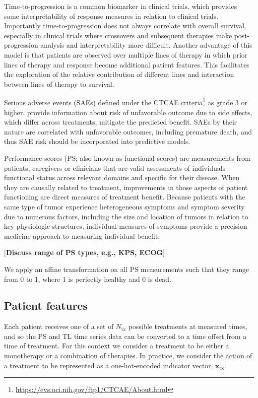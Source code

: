\documentclass[twocolumn]{bmcart}%
\newcommand{\todo}[1]{{\color{red} [\bf{#1}]}}
\def\v#1{\bm{#1}}
\begin{document}
Time-to-progression is a common biomarker in clinical trials, which provides
some interpretability of response measures in relation to clinical trials.
Importantly time-to-progression does not always correlate with overall
survival, especially in clinical trials where crossovers and subsequent
therapies make post-progression analysis and interpretability more difficult.
Another advantage of this model is that patients are observed over multiple
lines of therapy in which prior lines of therapy and response become additional
patient features.  This facilitates the exploration of the relative
contribution of different lines and interaction between lines of therapy to
survival.

Serious adverse events (SAEs) defined under the \mbox{CTCAE}
criteria\footnote{\url{https://evs.nci.nih.gov/ftp1/CTCAE/About.html}} as grade
3 or higher, provide information about risk of unfavorable outcome due to side
effects, which differ across treatments, mitigate the predicted benefit.  SAEs
by their nature are correlated with unfavorable outcomes, including premature
death, and thus SAE risk should be incorporated into predictive models.

Performance scores (PS; also known as functional scores) are measurements from
patients, caregivers or clinicians that are valid assessments of individuals
functional status across relevant domains and specific for their disease.  When
they are causally related to treatment, improvements in those aspects of
patient functioning are direct measures of treatment benefit.  Because patients
with the same type of tumor experience heterogeneous symptoms and symptom
severity due to numerous factors, including the size and location of tumors in
relation to key physiologic structures, individual measures of symptoms provide
a precision medicine approach to measuring individual benefit.

\todo{Discuss range of PS types, e.g., KPS, ECOG}

We apply an affine transformation on all PS measurements such that they range
from 0 to 1, where 1 is perfectly healthy and 0 is dead.


\subsection{Patient features}\label{sec:data-features}

Each patient receives one of a set of $N_\text{tx}$
possible treatments at measured times, and so the PS and TL time series data
can be converted to a time offset from a time of treatment.  For this context
we consider a treatment to be either a monotherapy or a combination of
therapies.  In practice, we consider the action of a treatment to be
represented as a one-hot-encoded indicator vector, $\v x_\text{tx}$.
\end{document}

